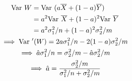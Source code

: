 \documentclass[twocolumn]{article}
\numberwithin{equation}{section}
\renewcommand{\bar}[1]{\overline{#1}}
\begin{document}
\subsection{}\begin{gather*}
\begin{aligned}
\var W
&=\var{(a\bar X+(1-a)\bar Y)}\\
&=a^2 \var\bar X+(1-a)^2\var\bar Y\\
&=a^2\sigma_1^2/n+(1-a)^2\sigma_2^2/m\\
\end{aligned}\\
\implies \var{'(W)}=2a\sigma_1^2/n-2(1-a)\sigma_2^2/m\\
\implies \hat a\sigma_1^2/n=\sigma_2^2/m-\hat a\sigma_2^2/m\\
\implies \hat a=\frac{\sigma_2^2/m}{\sigma_1^2/n+\sigma_2^2/m}
\end{gather*}
\end{document}
